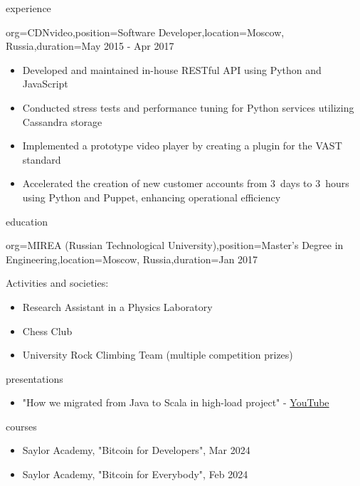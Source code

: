 \documentclass{resume}
\begin{document}
\begin{ResumeSection}{experience}
    \begin{ResumeSubsection}{org=CDNvideo,position=Software Developer,location={Moscow, Russia},duration=May 2015 - Apr 2017}
        \begin{itemize}
            \item Developed and maintained in-house RESTful API using Python and JavaScript
            \item Conducted stress tests and performance tuning for Python services utilizing Cassandra storage
            \item Implemented a prototype video player by creating a plugin for the VAST standard
            \item Accelerated the creation of new customer accounts from 3~days to 3~hours using Python and Puppet, enhancing operational efficiency
        \end{itemize}
    \end{ResumeSubsection}
\end{ResumeSection}

\begin{ResumeSection}{education}
    \begin{ResumeSubsection}{org={MIREA (Russian Technological University)},position={Master's Degree in Engineering},location={Moscow, Russia},duration=Jan 2017}
        
        \medskip
        Activities and societies:
        \begin{itemize}
            \item Research Assistant in a Physics Laboratory
            \item Chess Club
            \item University Rock Climbing Team (multiple competition prizes)
        \end{itemize}
    \end{ResumeSubsection}
\end{ResumeSection}

\begin{ResumeSection}{presentations}
    \begin{itemize}
        \item "How we migrated from Java to Scala in high-load project" - \href{https://www.youtube.com/watch?v=7hEcX6lynYU}{YouTube}
    \end{itemize}
\end{ResumeSection}

\bigskip

\begin{ResumeSection}{courses}
    \begin{itemize}
        \item Saylor Academy, "Bitcoin for Developers", Mar 2024
        \item Saylor Academy, "Bitcoin for Everybody", Feb 2024
    \end{itemize}
\end{ResumeSection}
\end{document}
